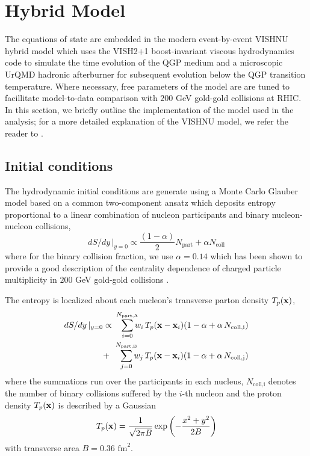 \documentclass[aps,prc,reprint,amsmath,nofootinbib,superscriptaddress]{revtex4-1}
\begin{document}

\section{Hybrid Model}

The equations of state are embedded in the modern event-by-event VISHNU hybrid model which uses the VISH2+1 boost-invariant viscous hydrodynamics code to simulate the 
time evolution of the QGP medium and a microscopic UrQMD hadronic afterburner for subsequent evolution below the QGP transition temperature. Where necessary, free
parameters of the model are are tuned to facillitate model-to-data comparison with $200$ GeV gold-gold collisions at RHIC. In this section, we briefly outline
the implementation of the model used in the analysis; for a more detailed explanation of the VISHNU model, we refer the reader to \cite{Shen:2014vra}. 

\subsection{Initial conditions}
\label{initial_condition}

The hydrodynamic initial conditions are generate using a Monte Carlo Glauber model based on a common two-component ansatz which deposits entropy proportional to a linear combination 
of nucleon participants and binary nucleon-nucleon collisions,
\begin{equation}
 dS/dy \,\vert_{y=0} \propto \frac{(1-\alpha)}{2}N_\text{part} + \alpha N_\text{coll}
 \label{twocomponent}
\end{equation}
where for the binary collision fraction, we use $\alpha=0.14$ which has been shown to provide a good description of the centrality dependence of charged particle 
multiplicity in $200$ GeV gold-gold collisions \cite{Shen:2014sfi}.

The entropy is localized about each nucleon's transverse parton density $T_p({\bf x})$,
\begin{eqnarray}
 dS/dy \,\vert_{y=0} &\propto& \smashoperator{\sum_{i=0}^{N_\text{part,A}}} w_i\, T_p({\bf x} - {\bf x}_i)(1-\alpha + \alpha\, N_\text{coll,i}) \nonumber \\
                     &+& \smashoperator{\sum_{j=0}^{N_\text{part,B}}} w_j\, T_p({\bf x} - {\bf x}_i)(1-\alpha + \alpha\, N_\text{coll,j})
 \label{glauber}
\end{eqnarray}
where the summations run over the participants in each nucleus, $N_\text{coll,i}$ denotes the number of binary collisions suffered by the $i$-th nucleon 
and the proton density $T_p({\bf x})$ is described by a Gaussian
\begin{equation}
 T_p({\bf x}) = \frac{1}{\sqrt{2 \pi B}} \exp \left(-\frac{x^2+y^2}{2 B} \right)
\end{equation}
with transverse area $B = 0.36$ $\text{fm}^2$.
\end{document}
